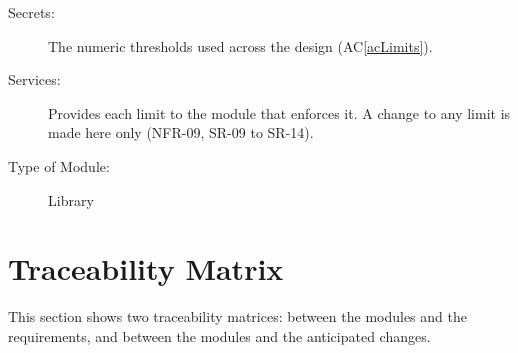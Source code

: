 \documentclass[12pt, titlepage]{article}
\newcommand{\acref}[1]{AC\ref{#1}}
\begin{document}
\begin{description}
\item[Secrets:] The numeric thresholds used across the design (\acref{acLimits}).
\item[Services:] Provides each limit to the module that enforces it. A change to
  any limit is made here only (NFR-09, SR-09 to SR-14).
\item[Type of Module:] Library
\end{description}

\section{Traceability Matrix} \label{SecTM}

This section shows two traceability matrices: between the modules and the
requirements, and between the modules and the anticipated changes.
\end{document}
